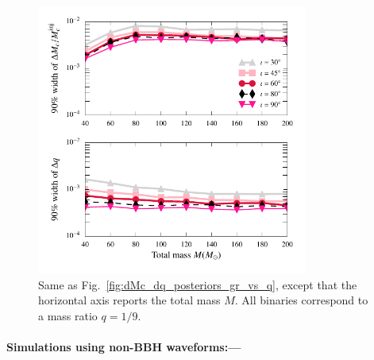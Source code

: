 \documentclass[prl,preprintnumbers,twocolumn,eqsecnum,floatfix,a4paper,nofootinbib,superscriptaddress]{revtex4}
\begin{document}
\begin{figure}[tbh]
	\includegraphics*[width=3.5in]{figs/fig3b_9dim_dmcbymcinj_dq_abhi.pdf}
	\caption{Same as Fig.~\ref{fig:dMc_dq_posteriors_gr_vs_q}, except that the horizontal axis reports the total mass $M$. All binaries correspond to a mass ratio $q = 1/9$.}
	\label{fig:dMc_dq_posteriors_gr_vs_M}
\end{figure}

\paragraph{Simulations using non-BBH waveforms:---}
\end{document}
